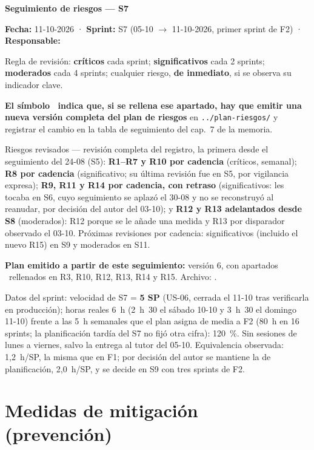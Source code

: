 \documentclass[11pt,a4paper]{article}
\begin{document}
\begin{center}
  {\LARGE\bfseries Seguimiento de riesgos — S7}\\[6pt]
\end{center}

\textbf{Fecha:} 11-10-2026 · \textbf{Sprint:} S7 (05-10 \(\to\) 11-10-2026, primer sprint de F2) · \textbf{Responsable:} \thesisAuthor

Regla de revisión: \textbf{críticos} cada sprint; \textbf{significativos} cada 2 sprints; \textbf{moderados} cada 4 sprints; cualquier riesgo, \textbf{de inmediato}, si se observa su indicador clave.

\textbf{El símbolo \updatesymbol\ indica que, si se rellena ese apartado, hay que emitir una nueva versión completa del plan de riesgos} en \texttt{../plan-riesgos/} y registrar el cambio en la tabla de seguimiento del cap.~7 de la memoria.

Riesgos revisados — revisión completa del registro, la primera desde el seguimiento del 24-08 (S5):
\textbf{R1--R7 y R10 por cadencia} (críticos, semanal);
\textbf{R8 por cadencia} (significativo; su última revisión fue en S5, por vigilancia expresa);
\textbf{R9, R11 y R14 por cadencia, con retraso} (significativos: les tocaba en S6, cuyo seguimiento se aplazó el 30-08 y no se reconstruyó al reanudar, por decisión del autor del 03-10);
y \textbf{R12 y R13 adelantados desde S8} (moderados): R12 porque se le añade una medida y R13 por disparador observado el 03-10.
Próximas revisiones por cadencia: significativos (incluido el nuevo R15) en S9 y moderados en S11.

\textbf{Plan emitido a partir de este seguimiento:} versión 6, con apartados \updatesymbol\ rellenados en R3, R10, R12, R13, R14 y R15.\newline
Archivo: .

Datos del sprint: velocidad de S7 = \textbf{5 SP} (US-06, cerrada el 11-10 tras verificarla en producción); horas reales 6~h (2~h~30 el sábado 10-10 y 3~h~30 el domingo 11-10) frente a las 5~h semanales que el plan asigna de media a F2 (80~h en 16 sprints; la planificación tardía del S7 no fijó otra cifra): 120~\%.
Sin sesiones de lunes a viernes, salvo la entrega al tutor del 05-10.
Equivalencia observada: 1,2~h/SP, la misma que en F1; por decisión del autor se mantiene la de planificación, 2,0~h/SP, y se decide en S9 con tres sprints de F2.

\bigline

\section{Medidas de mitigación (prevención)}
\end{document}
